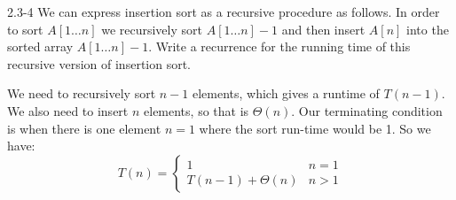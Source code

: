 \begin{problem}{2.3-4}
  We can express insertion sort as a recursive procedure as follows. In order to sort $A[1\ldots n]$ we recursively sort
  $A[1\ldots n] - 1 $ and then insert $A[n]$ into the sorted array $A[1\ldots n] - 1 $.
  Write a recurrence for the running time of this recursive version of insertion sort.
  \begin{solution}
    We need to recursively sort $n - 1$ elements, which gives a runtime of $T(n - 1)$.
    We also need to insert $n$ elements, so that is $\Theta(n)$. Our terminating
    condition is when there is one element $n = 1$ where the sort run-time would be 1. So we have:
    \[
      T(n) = \begin{cases}
      1 & n = 1 \\
      T(n-1) + \Theta(n) & n > 1
      \end{cases}
    \]
  \end{solution}
\end{problem}


